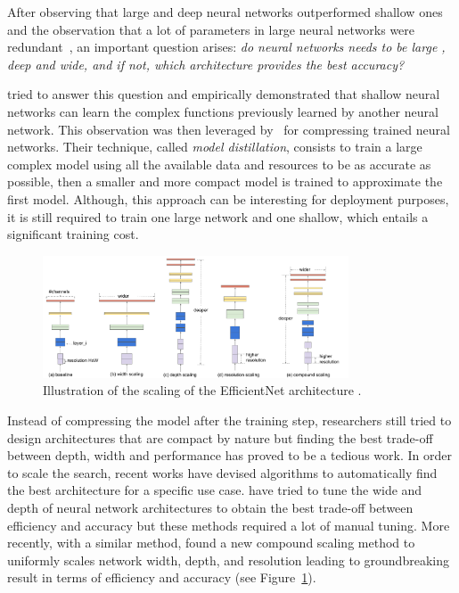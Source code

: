 After observing that large and deep neural networks outperformed shallow ones \cite{huang2019gpipe,brown2020language} and the observation that a lot of parameters in large neural networks were redundant~\cite{dai2018compressing,frankle2018lottery}, an important question arises: \emph{do neural networks needs to be large \ie, deep and wide, and if not, which architecture provides the best accuracy?} 

\citet{ba2014deep} tried to answer this question and empirically demonstrated that shallow neural networks can learn the complex functions previously learned by another neural network. 
This observation was then leveraged by~\citet{hinton2015distilling} for compressing trained neural networks.
Their technique, called \emph{model distillation}, consists to train a large complex model using all the available data and resources to be as accurate as possible, then a smaller and more compact model is trained to approximate the first model.
Although, this approach can be interesting for deployment purposes, it is still required to train one large network and one shallow, which entails a significant training cost.

\begin{figure}[t]
  \centering
  \includegraphics[width=0.81\textwidth]{figures/main/ch3-related_work/scalecompare.pdf}
  \caption{Illustration of the scaling of the EfficientNet architecture \cite{tan2019efficientnet}.}
  \label{figure:p1-ch3-illustration_efficientnet}
\end{figure}

Instead of compressing the model after the training step, researchers still tried to design architectures that are compact by nature but finding the best trade-off between depth, width and performance has proved to be a tedious work.
In order to scale the search, recent works have devised algorithms to automatically find the best architecture for a specific use case.
\citet{zoph2018learning,real2019regularized} have tried to tune the wide and depth of neural network architectures to obtain the best trade-off between efficiency and accuracy but these methods required a lot of manual tuning.
More recently, with a similar method, \citet{tan2019efficientnet} found a new compound scaling method to uniformly scales network width, depth, and resolution leading to groundbreaking result in terms of efficiency and accuracy (see Figure~\ref{figure:p1-ch3-illustration_efficientnet}).










